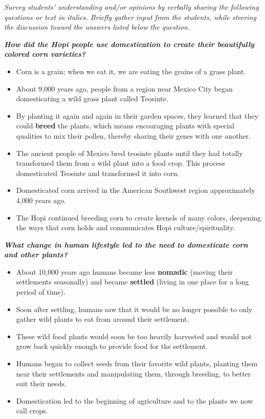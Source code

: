 \documentclass[12pt,]{article}
\providecommand{\tightlist}{%
  \setlength{\itemsep}{0pt}\setlength{\parskip}{0pt}}
\begin{document}
\emph{Survey students' understanding and/or opinions by verbally sharing the following questions or text in italics. Briefly gather input from the students, while steering the discussion toward the answers listed below the question.}

\textbf{\emph{How did the Hopi people use domestication to create their beautifully colored corn varieties?}}

\begin{itemize}
\tightlist
\item
  Corn is a grain; when we eat it, we are eating the grains of a grass plant.
\item
  About 9,000 years ago, people from a region near Mexico City began domesticating a wild grass plant called Teosinte.
\item
  By planting it again and again in their garden spaces, they learned that they could \textbf{breed} the plants, which means encouraging plants with special qualities to mix their pollen, thereby sharing their genes with one another.
\item
  The ancient people of Mexico bred teosinte plants until they had totally transformed them from a wild plant into a food crop. This process domesticated Teosinte and transformed it into corn.
\item
  Domesticated corn arrived in the American Southwest region approximately 4,000 years ago.
\item
  The Hopi continued breeding corn to create kernels of many colors, deepening the ways that corn holds and communicates Hopi culture/spirituality.
\end{itemize}

\textbf{\emph{What change in human lifestyle led to the need to domesticate corn and other plants? }}

\begin{itemize}
\tightlist
\item
  About 10,000 years ago humans became less \textbf{nomadic} (moving their settlements seasonally) and became \textbf{settled} (living in one place for a long period of time).
\item
  Soon after settling, humans saw that it would be no longer possible to only gather wild plants to eat from around their settlement.
\item
  These wild food plants would soon be too heavily harvested and would not grow back quickly enough to provide food for the settlement.
\item
  Humans began to collect seeds from their favorite wild plants, planting them near their settlements and manipulating them, through breeding, to better suit their needs.
\item
  Domestication led to the beginning of agriculture and to the plants we now call crops.
\end{itemize}
\end{document}
